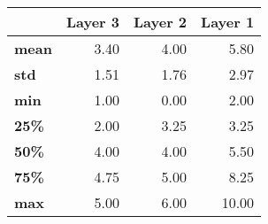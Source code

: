 \begin{tabular}{lrrr}
\toprule
{} &  Layer 3 &  Layer 2 &  Layer 1 \\
\midrule
\textbf{mean} &     3.40 &     4.00 &     5.80 \\
\textbf{std } &     1.51 &     1.76 &     2.97 \\
\textbf{min } &     1.00 &     0.00 &     2.00 \\
\textbf{25\% } &     2.00 &     3.25 &     3.25 \\
\textbf{50\% } &     4.00 &     4.00 &     5.50 \\
\textbf{75\% } &     4.75 &     5.00 &     8.25 \\
\textbf{max } &     5.00 &     6.00 &    10.00 \\
\bottomrule
\end{tabular}
